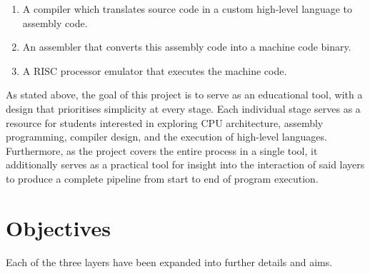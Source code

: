 \documentclass{article}
\begin{document}
    \begin{enumerate}
        \item A compiler which translates source code in a custom high-level language to assembly code.
        \item An assembler that converts this assembly code into a machine code binary.
        \item A RISC processor emulator that executes the machine code.
    \end{enumerate}

    As stated above, the goal of this project is to serve as an educational tool, with a design that prioritises simplicity at every stage.
    Each individual stage serves as a resource for students interested in exploring CPU architecture, assembly programming, compiler design, and the execution of high-level languages.
    Furthermore, as the project covers the entire process in a single tool, it additionally serves as a practical tool for insight into the interaction of said layers to produce a complete pipeline from start to end of program execution.

    \section{Objectives}\label{sec:objectives}

    Each of the three layers have been expanded into further details and aims.
\end{document}
